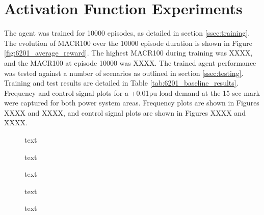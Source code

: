 \section{Activation Function Experiments}
The agent was trained for 10000 episodes, as detailed in section \ref{ssec:training}. The evolution of MACR100 over the 10000 episode duration is shown in Figure \ref{fig:6201_average_reward}. The highest MACR100 during training was XXXX, and the MACR100 at episode 10000 was XXXX. The trained agent performance was tested against a number of scenarios as outlined in section \ref{ssec:testing}. Training and test results are detailed in Table \ref{tab:6201_baseline_results}. Frequency and control signal plots for a +0.01pu load demand at the 15 sec mark were captured for both power system areas. Frequency plots are shown in Figures XXXX and XXXX, and control signal plots are shown in Figures XXXX and XXXX.

\vspace{2cm}

\begin{figure}[h]
	\centering
	
	\caption{text}
\end{figure}





\begin{figure}[h]
	\centering
	
	
	\caption{text}
	
	
	\caption{text}
	
	
	\caption{text}
		
	
	\caption{text}
\end{figure}
